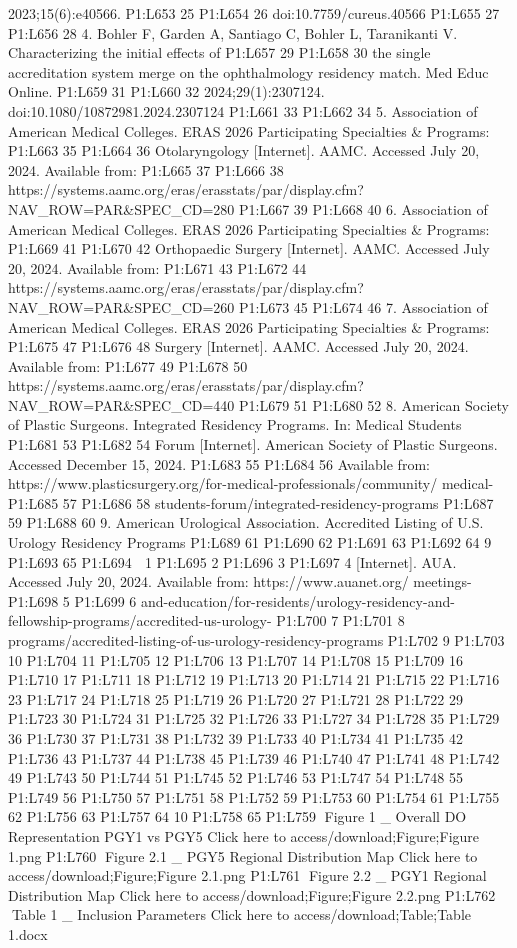 2023;15(6):e40566. P1:L653 25 P1:L654 26 doi:10.7759/cureus.40566
P1:L655 27 P1:L656 28 4. Bohler F, Garden A, Santiago C, Bohler L,
Taranikanti V. Characterizing the initial effects of P1:L657 29 P1:L658
30 the single accreditation system merge on the ophthalmology residency
match. Med Educ Online. P1:L659 31 P1:L660 32 2024;29(1):2307124.
doi:10.1080/10872981.2024.2307124 P1:L661 33 P1:L662 34 5. Association
of American Medical Colleges. ERAS 2026 Participating Specialties \&
Programs: P1:L663 35 P1:L664 36 Otolaryngology {[}Internet{]}. AAMC.
Accessed July 20, 2024. Available from: P1:L665 37 P1:L666 38
https://systems.aamc.org/eras/erasstats/par/display.cfm?NAV\_ROW=PAR\&SPEC\_CD=280
P1:L667 39 P1:L668 40 6. Association of American Medical Colleges. ERAS
2026 Participating Specialties \& Programs: P1:L669 41 P1:L670 42
Orthopaedic Surgery {[}Internet{]}. AAMC. Accessed July 20, 2024.
Available from: P1:L671 43 P1:L672 44
https://systems.aamc.org/eras/erasstats/par/display.cfm?NAV\_ROW=PAR\&SPEC\_CD=260
P1:L673 45 P1:L674 46 7. Association of American Medical Colleges. ERAS
2026 Participating Specialties \& Programs: P1:L675 47 P1:L676 48
Surgery {[}Internet{]}. AAMC. Accessed July 20, 2024. Available from:
P1:L677 49 P1:L678 50
https://systems.aamc.org/eras/erasstats/par/display.cfm?NAV\_ROW=PAR\&SPEC\_CD=440
P1:L679 51 P1:L680 52 8. American Society of Plastic Surgeons.
Integrated Residency Programs. In: Medical Students P1:L681 53 P1:L682
54 Forum {[}Internet{]}. American Society of Plastic Surgeons. Accessed
December 15, 2024. P1:L683 55 P1:L684 56 Available from:
https://www.plasticsurgery.org/for-medical-professionals/community/
medical- P1:L685 57 P1:L686 58
students-forum/integrated-residency-programs P1:L687 59 P1:L688 60 9.
American Urological Association. Accredited Listing of U.S. Urology
Residency Programs P1:L689 61 P1:L690 62 P1:L691 63 P1:L692 64 9 P1:L693
65 P1:L694  1 P1:L695 2 P1:L696 3 P1:L697 4 {[}Internet{]}. AUA.
Accessed July 20, 2024. Available from: https://www.auanet.org/
meetings- P1:L698 5 P1:L699 6
and-education/for-residents/urology-residency-and-fellowship-programs/accredited-us-urology-
P1:L700 7 P1:L701 8
programs/accredited-listing-of-us-urology-residency-programs P1:L702 9
P1:L703 10 P1:L704 11 P1:L705 12 P1:L706 13 P1:L707 14 P1:L708 15
P1:L709 16 P1:L710 17 P1:L711 18 P1:L712 19 P1:L713 20 P1:L714 21
P1:L715 22 P1:L716 23 P1:L717 24 P1:L718 25 P1:L719 26 P1:L720 27
P1:L721 28 P1:L722 29 P1:L723 30 P1:L724 31 P1:L725 32 P1:L726 33
P1:L727 34 P1:L728 35 P1:L729 36 P1:L730 37 P1:L731 38 P1:L732 39
P1:L733 40 P1:L734 41 P1:L735 42 P1:L736 43 P1:L737 44 P1:L738 45
P1:L739 46 P1:L740 47 P1:L741 48 P1:L742 49 P1:L743 50 P1:L744 51
P1:L745 52 P1:L746 53 P1:L747 54 P1:L748 55 P1:L749 56 P1:L750 57
P1:L751 58 P1:L752 59 P1:L753 60 P1:L754 61 P1:L755 62 P1:L756 63
P1:L757 64 10 P1:L758 65 P1:L759 Figure 1 \_ Overall DO Representation
PGY1 vs PGY5 Click here to access/download;Figure;Figure 1.png P1:L760
Figure 2.1 \_ PGY5 Regional Distribution Map Click here to
access/download;Figure;Figure 2.1.png P1:L761 Figure 2.2 \_ PGY1
Regional Distribution Map Click here to access/download;Figure;Figure
2.2.png P1:L762 Table 1 \_ Inclusion Parameters Click here to
access/download;Table;Table 1.docx

